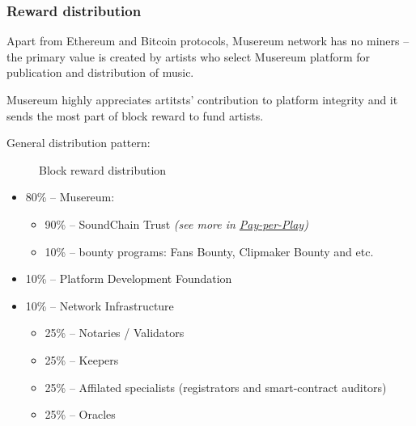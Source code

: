 \documentclass[12pt]{report}
\newcommand{\hlc}[1]{\colorbox{yellow!25}{#1}}
\begin{document}
\subsubsection{Reward distribution}
\label{tech-blockchain-reward-distribution}
Apart from Ethereum and Bitcoin protocols, Musereum network has no miners – the primary value is created by artists who select Musereum platform for publication and distribution of music.

Musereum highly appreciates artitsts' contribution to platform integrity and it sends the most part of block reward to fund artists.

General distribution pattern:

\def\Musereum{Musereum}
\def\Development{Platform Development}
\def\Infrastructure{Infrastructure}

\begin{figure}[h]
\centering
\caption{Block reward distribution}
\vspace{20pt}
\end{figure}

\begin{itemize}
	\item 80\% – Musereum:
	\begin{itemize}
		\item 90\% – SoundChain Trust \textit{(see more in \hyperref[tech-apps-soundchain-payperplay]{Pay-per-Play})}
		\item 10\% – bounty programs: Fans Bounty, Clipmaker Bounty and etc.
	\end{itemize}
	\item 10\% – Platform Development Foundation
	\item 10\% – \hlc{Network Infrastructure}
	\begin{itemize}
		\item 25\% – Notaries / Validators
		\item 25\% – \hlc{Keepers}
		\item 25\% – Affilated specialists (\hlc{registrators} and smart-contract auditors)
		\item 25\% – Oracles
	\end{itemize}
\end{itemize}
\end{document}

